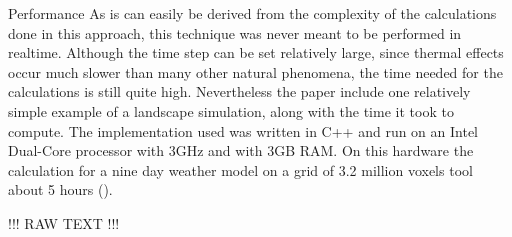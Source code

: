 Performance
As is can easily be derived from the complexity of the calculations done in this approach, this technique was never meant to be performed in realtime. Although the time step can be set relatively large, since thermal effects occur much slower than many other natural phenomena, the time needed for the calculations is still quite high.
Nevertheless the paper include one relatively simple example of a landscape simulation, along with the time it took to compute. The implementation used was written in C++ and run on an Intel Dual-Core processor with 3GHz and with 3GB RAM. On this hardware the calculation for a nine day weather model on a grid of 3.2 million voxels tool about 5 hours ().

!!! RAW TEXT !!!